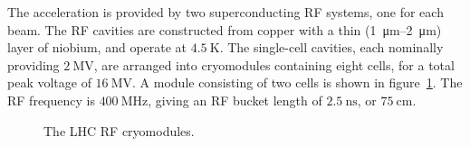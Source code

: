 The acceleration is provided by two superconducting RF systems, one for each beam. The RF cavities are constructed from copper with a thin (\SIrange{1}{2}{\micro\meter}) layer of niobium, and operate at $\SI{4.5}{\kelvin}$. The single-cell cavities, each nominally providing $\SI{2}{\mega\volt}$, are arranged into cryomodules containing eight cells, for a total peak voltage of $\SI{16}{\mega\volt}$. A module consisting of two cells is shown in figure~\ref{fig:RF-module}. The RF frequency is $\SI{400}{\mega\hertz}$, giving an RF bucket length of $\SI{2.5}{\nano\second}$, or $\SI{75}{\centi\meter}$. 

\begin{figure}[htbp]
	\centering
	\hfill
	\caption{The LHC RF cryomodules.}
	\label{fig:RF-module}
\end{figure}

